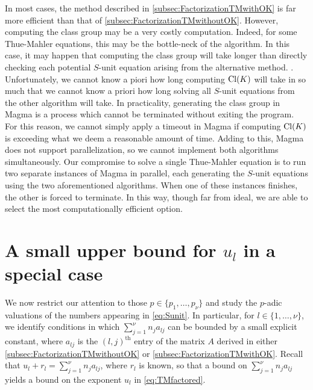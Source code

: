 In most cases, the method described in \autoref{subsec:FactorizationTMwithOK} is far more efficient than that of \autoref{subsec:FactorizationTMwithoutOK}. However, computing the class group may be a very costly computation. Indeed, for some Thue-Mahler equations, this may be the bottle-neck of the algorithm. In this case, it may happen that computing the class group will take longer than directly checking each potential $S$-unit equation arising from the alternative method. . Unfortunately, we cannot know a piori how long computing $\operatorname{Cl}(K)$ will take in so much that we cannot know a priori how long solving all $S$-unit equations from the other algorithm will take. In practicality, generating the class group in Magma  is a process which cannot be terminated without exiting the program. For this reason, we cannot simply apply a timeout in Magma if computing $\operatorname{Cl}(K)$ is exceeding what we deem a reasonable amount of time. Adding to this, Magma does not support parallelization, so we cannot implement both algorithms simultaneously. Our compromise to solve a single Thue-Mahler equation is to run two separate instances of Magma in parallel, each generating the $S$-unit equations using the two aforementioned algorithms. When one of these instances finishes, the other is forced to terminate. In this way, though far from ideal, we are able to select the most computationally efficient option. 


\section{A small upper bound for $u_l$ in a special case}
\label{sec:SmallBoundForSpecialCase}

We now restrict our attention to those $p \in \{p_1, \dots, p_{\nu}\}$ and study the $p$-adic valuations of the numbers appearing in \eqref{eq:Sunit}. In particular, for $l \in \{1, \dots, \nu\}$, we identify conditions in which $\sum_{j = 1}^{\nu} n_ja_{lj}$ can be bounded by a small explicit constant, where $a_{lj}$ is the $(l,j)^{\text{th}}$ entry of the matrix $A$ derived in either \autoref{subsec:FactorizationTMwithoutOK} or \autoref{subsec:FactorizationTMwithOK}. Recall that $u_l + r_l = \sum_{j = 1}^{\nu} n_ja_{lj}$, where $r_l$ is known, so that a bound on $\sum_{j = 1}^{\nu} n_ja_{lj}$ yields a bound on the exponent $u_l$ in \eqref{eq:TMfactored}.

